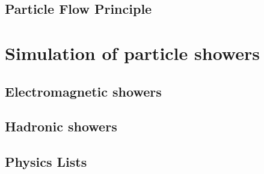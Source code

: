 \subsection{Particle Flow Principle}
\section{Simulation of particle showers}
\subsection{Electromagnetic showers}
\subsection{Hadronic showers}
\subsection{Physics Lists}
